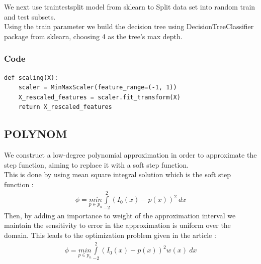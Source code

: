 \documentclass{article}
\begin{document}
We next use train\textunderscore test\textunderscore split model from sklearn to Split data set into random train and test subsets.\\ 
Using the train parameter we build the decision tree using DecisionTreeClassifier package from sklearn, choosing 4 as the tree's max depth. 
\subsubsection{Code}
\begin{lstlisting}
def scaling(X):
    scaler = MinMaxScaler(feature_range=(-1, 1))
    X_rescaled_features = scaler.fit_transform(X)
    return X_rescaled_features
\end{lstlisting}
\subsection{POLYNOM}


We construct a low-degree polynomial approximation in order to approximate the step function, aiming to replace it with a soft step function.\\
This is done by using mean square integral solution which is the soft step function : 
\begin{equation}
\begin{split}
\phi = \underset{p \in p_n}{min}\int\limits_{-2}^2 (I_0(x) - p(x))^2 \ dx
\end{split}
\end{equation}
 Then, by adding an importance to weight of the approximation interval we maintain the sensitivity to error in the approximation is uniform over the domain.
This leads to the optimization problem given in the article :
\begin{equation}
\begin{split}
\phi = \underset{p \in p_n}{min}\int\limits_{-2}^2 (I_0(x) - p(x))^2 w(x) \ dx
\end{split}
\end{equation}
\end{document}
